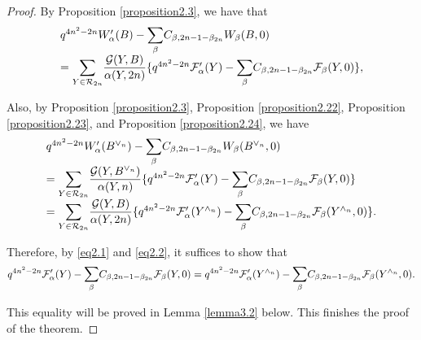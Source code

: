 \documentclass[11pt,oneside]{amsart}
\theoremstyle{plain}
\theoremstyle{definition}
\theoremstyle{remark}
\newcommand{\CF}{{\mathcal F}}
\newcommand{\CG}{{\mathcal G}}
\newcommand{\CR}{{\mathcal R}}
\numberwithin{equation}{section}
\begin{document}
	\begin{proof}
		By Proposition \ref{proposition2.3}, we have that
		\begin{equation}\label{eq3.1}
			\begin{array}{ll}
				q^{4n^2-2n}W_{\alpha}'(B)-\mathlarger{\sum}_{\beta}C_{\beta,2n-1-\beta_{2n}}W_{\beta}(B,0)\\=\mathlarger{\sum}_{Y \in \CR_{2n}}\dfrac{\CG(Y,B)}{\alpha(Y,2n)}\lbrace q^{4n^2-2n}\CF_{\alpha}'(Y)-\mathlarger{\sum}_{\beta}C_{\beta,2n-1-\beta_{2n}}\CF_{\beta}(Y,0) \rbrace,
			\end{array}
		\end{equation}
		
		Also, by Proposition \ref{proposition2.3}, Proposition \ref{proposition2.22}, Proposition \ref{proposition2.23}, and Proposition \ref{proposition2.24}, we have
		\begin{equation}\label{eq3.2}
			\begin{array}{ll}
				q^{4n^2-2n}W_{\alpha}'(B^{\vee_n})-\mathlarger{\sum}_{\beta}C_{\beta,2n-1-\beta_{2n}}W_{\beta}(B^{\vee_n},0)\\=\mathlarger{\sum}_{Y \in \CR_{2n}}\dfrac{\CG(Y,B^{\vee_n})}{\alpha(Y,n)}\lbrace q^{4n^2-2n}\CF_{\alpha}'(Y)-\mathlarger{\sum}_{\beta}C_{\beta,2n-1-\beta_{2n}}\CF_{\beta}(Y,0) \rbrace\\
				=\mathlarger{\sum}_{Y \in \CR_{2n}}\dfrac{\CG(Y,B)}{\alpha(Y,2n)}\lbrace q^{4n^2-2n}\CF_{\alpha}'(Y^{\wedge_n})-\mathlarger{\sum}_{\beta}C_{\beta,2n-1-\beta_{2n}}\CF_{\beta}(Y^{\wedge_n},0) \rbrace.
			\end{array}
		\end{equation}
		
		Therefore, by \eqref{eq2.1} and \eqref{eq2.2}, it suffices to show that
		\begin{equation*}
			q^{4n^2-2n}\CF_{\alpha}'(Y)-\mathlarger{\sum}_{\beta}C_{\beta,2n-1-\beta_{2n}}\CF_{\beta}(Y,0)=q^{4n^2-2n}\CF_{\alpha}'(Y^{\wedge_n})-\mathlarger{\sum}_{\beta}C_{\beta,2n-1-\beta_{2n}}\CF_{\beta}(Y^{\wedge_n},0).
		\end{equation*}
		
		This equality will be proved in Lemma \ref{lemma3.2} below. This finishes the proof of the theorem.
	\end{proof}
	
	
	
\end{document}
